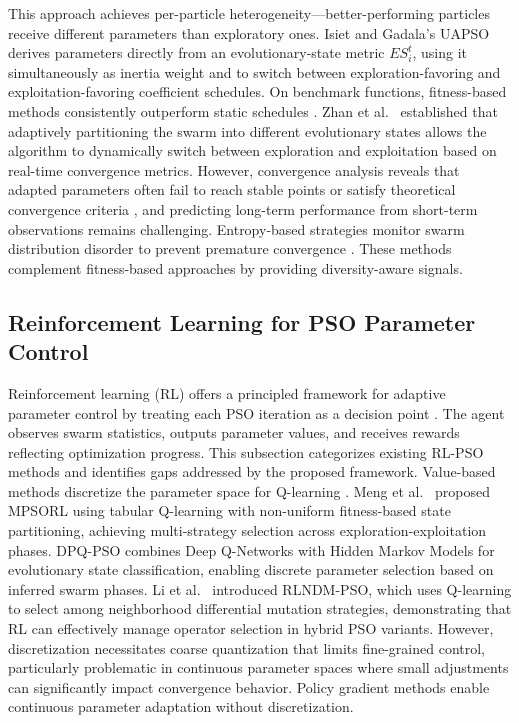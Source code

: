 \documentclass[final,5p,times]{elsarticle}
\begin{document}
This approach achieves per-particle heterogeneity---better-performing particles receive different parameters than exploratory ones.
Isiet and Gadala's UAPSO \cite{Isiet2019Selfadapting} derives parameters directly from an evolutionary-state metric $ES_i^{t}$, using it simultaneously as inertia weight and to switch between exploration-favoring and exploitation-favoring coefficient schedules.
On benchmark functions, fitness-based methods consistently outperform static schedules \cite{Li2017Particle}.
Zhan et al.\ \cite{Zhan2009Adaptive} established that adaptively partitioning the swarm into different evolutionary states allows the algorithm to dynamically switch between exploration and exploitation based on real-time convergence metrics.
However, convergence analysis reveals that adapted parameters often fail to reach stable points or satisfy theoretical convergence criteria \cite{Harrison2018Selfadaptive}, and predicting long-term performance from short-term observations remains challenging. Entropy-based strategies monitor swarm distribution disorder to prevent premature convergence \cite{Han2022Improved}.
These methods complement fitness-based approaches by providing diversity-aware signals. \subsection{Reinforcement Learning for PSO Parameter Control} Reinforcement learning (RL) offers a principled framework for adaptive parameter control by treating each PSO iteration as a decision point \cite{Sutton2018Reinforcement, Bai2023Evolutionary}.
The agent observes swarm statistics, outputs parameter values, and receives rewards reflecting optimization progress.
This subsection categorizes existing RL-PSO methods and identifies gaps addressed by the proposed framework. Value-based methods discretize the parameter space for Q-learning \cite{Watkins1992Qlearning}.
Meng et al.\ \cite{Meng2023Multistrategy} proposed MPSORL using tabular Q-learning with non-uniform fitness-based state partitioning, achieving multi-strategy selection across exploration-exploitation phases.
DPQ-PSO \cite{Aoun2024Deep} combines Deep Q-Networks with Hidden Markov Models for evolutionary state classification, enabling discrete parameter selection based on inferred swarm phases.
Li et al.\ \cite{Li2023Reinforcement} introduced RLNDM-PSO, which uses Q-learning to select among neighborhood differential mutation strategies, demonstrating that RL can effectively manage operator selection in hybrid PSO variants.
However, discretization necessitates coarse quantization that limits fine-grained control, particularly problematic in continuous parameter spaces where small adjustments can significantly impact convergence behavior. Policy gradient methods enable continuous parameter adaptation without discretization.
\end{document}
